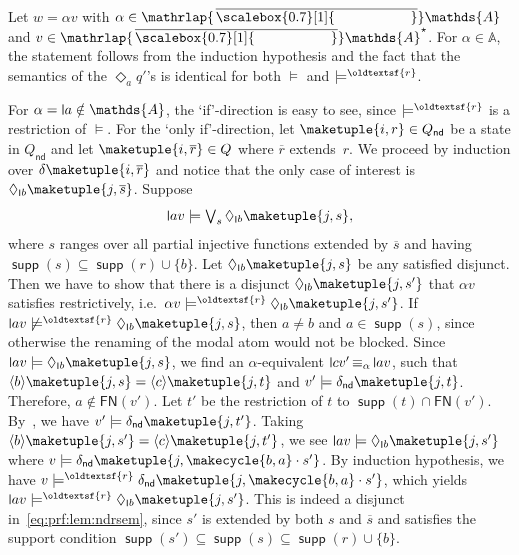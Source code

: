 \documentclass[10pt,a4paper]{amsart}
\theoremstyle{definition}
\renewcommand{\textsf}[1]{{\oldtextsf{\small#1}}}
\newcommand{\seq}{\subseteq}
\newcommand{\At}{\mathds{A}}
\newcommand{\barAs}{\barNames^{\star}}
\newcommand{\op}[1]{\operatorname{\mathsf{#1}}}
\newcommand{\nd}{\op{nd}}
\newcommand{\rsem}{\vDash^{\textsf{r}}}
\DeclareMathOperator{\supp}{\mathsf{supp}}
\newcommand{\names}{\At}
\newcommand{\braket}[1]{\langle #1 \rangle}
\newcommand{\set}[1]{\{#1\}}
\DeclareMathOperator{\alphaequiv}{\equiv_{\alpha}}
\newcommand{\mybar}[3]{%
  \mathrlap{\hspace{#2}\overline{\scalebox{#1}[1]{\phantom{\ensuremath{#3}}}}}\ensuremath{#3}
}
\newcommand{\FN}{\mathsf{FN}}
\newcommand{\barNames}{{\mybar{0.7}{1.25pt}{\names}}}
\renewcommand{\vDash}{\models}
\newcommand{\midmid}{\hspace{0.2ex}{\rule[-0.1ex]{0.6pt}{1.65ex}}\hspace{0.2ex}}
\newcommand{\scriptmidmid}{\hspace{0.2ex}{\rule[-0.1ex]{0.6pt}{1.1ex}}\hspace{0.2ex}}
\newcommand{\newletter}[1]{{\midmid}#1}
\newcommand{\scriptnew}[1]{{\scriptmidmid}#1}
\renewcommand{\enquote}[1]{`#1'}
\begin{document}
  Let $w = \alpha v$ with $\alpha \in \barNames$ and $v \in \barAs$. For $\alpha \in \names$, the statement follows
  from the induction hypothesis and the fact that the semantics of the $\Diamond_a q'$'s is identical for
  both $\vDash$ and $\rsem$.

  For $\alpha = \newletter{a} \notin\names$,
  the \enquote{if}-direction is easy to see, since $\rsem$ is a restriction of $\vDash$.
  For the \enquote{only if}-direction, let $\maketuple{i, r} \in Q_{\nd}$ be a state in $Q_{\nd}$ and let $\maketuple{i, \overline{r}}
  \in Q$ where $\overline{r}$ extends~$r$. We proceed by induction over $\delta\maketuple{i, \overline{r}}$ and notice that the
  only case of interest is $\Diamond_{\scriptnew{b}} \maketuple{j, \overline{s}}$.
  Suppose 
  \begin{equation}\label{eq:prf:lem:ndrsem}
    \newletter{a} v
    \vDash
    \textstyle\bigvee_s \Diamond_{\scriptnew{b}} \maketuple{j, s},
  \end{equation}
  where $s$ ranges over all partial injective functions extended by $\overline{s}$ and having $\supp(s) \seq \supp(r) \cup \set{b}$.
  Let $\Diamond_{\scriptnew{b}} \maketuple{j, s}$ be any satisfied disjunct.
  Then we have to show that there is a disjunct $\Diamond_{\scriptnew{b}} \maketuple{j, s'}$ that $\alpha v$ satisfies restrictively, i.e.~$\alpha v \rsem \Diamond_{\scriptnew{b}} \maketuple{j, s'}$.
  If $\newletter{a} v \not\rsem \Diamond_{\scriptnew{b}} \maketuple{j, s}$, then $a \neq b$ and
  $a \in \supp(s)$, since otherwise the renaming of the modal atom would not be blocked.
  Since $\newletter{a} v \vDash \Diamond_{\scriptnew{b}} \maketuple{j, s}$, we find an $\alpha$-equivalent
  $\newletter{c}v' \alphaequiv \newletter{a} v$, such that $\braket{b}\maketuple{j, s} = \braket{c}\maketuple{j, t}$
  and $v' \vDash \delta_{\nd}\maketuple{j, t}$. Therefore, $a \notin \FN(v')$. Let $t'$ be the restriction of $t$ to $\supp(t) \cap \FN(v')$.
  By~, we have $v' \vDash \delta_{\nd}\maketuple{j, t'}$.
  Taking $\braket{b}\maketuple{j, s'} = \braket{c}\maketuple{j, t'}$, we see $\newletter{a} v \vDash \Diamond_{\scriptnew{b}}
  \maketuple{j, s'}$ where $v \vDash \delta_{\nd}\maketuple{j, \makecycle{b, a}\cdot s'}$. By induction hypothesis, we have $v \rsem \delta_{\nd}\maketuple{j,
  \makecycle{b, a}\cdot s'}$, which yields $\newletter{a} v \rsem \Diamond_{\scriptnew{b}}\maketuple{j, s'}$.
  This is indeed a disjunct in~\eqref{eq:prf:lem:ndrsem}, since $s'$ is extended by both $s$ and $\overline{s}$ and satisfies the
  support condition $\supp(s') \seq \supp(s) \seq \supp(r) \cup \set{b}$.
\end{document}
